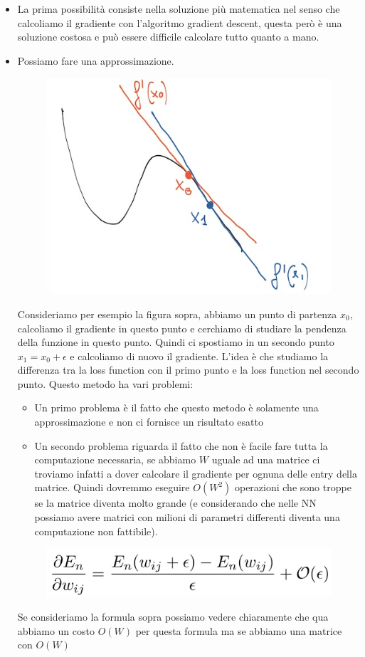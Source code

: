 \documentclass[14pt]{extreport}
\begin{document}
\begin{itemize}
\item La prima possibilità consiste nella soluzione più matematica nel senso che calcoliamo il gradiente con l'algoritmo gradient descent, questa però
è una soluzione costosa e può essere difficile calcolare tutto quanto a mano.
\item Possiamo fare una approssimazione. 

\begin{figure}[H]
\centering
\includegraphics[width=0.4\linewidth]{378.jpeg}
\end{figure} 
Consideriamo per esempio la figura sopra, abbiamo un punto di partenza $x_0$, calcoliamo il gradiente in questo punto e cerchiamo di studiare la
	pendenza della funzione in questo punto. Quindi ci spostiamo in un secondo punto $x_1 = x_0 + \epsilon$ e calcoliamo di nuovo il gradiente. L'idea è
	che studiamo la differenza tra la loss function con il primo punto e la loss function nel secondo punto. Questo metodo ha vari problemi:
	\begin{itemize}
	\item Un primo problema è il fatto che questo metodo è solamente una approssimazione e non ci fornisce un risultato esatto
	\item Un secondo problema riguarda il fatto che non è facile fare tutta la computazione necessaria, se abbiamo $W$ uguale ad una matrice ci troviamo
	infatti a dover calcolare il gradiente per ognuna delle entry della matrice. Quindi dovremmo eseguire $O(W^2)$ operazioni che sono troppe se la
	matrice diventa molto grande (e considerando che nelle NN possiamo avere matrici con milioni di parametri differenti diventa una computazione non
	fattibile).
	\end{itemize} 
\begin{figure}[H]
\centering
\includegraphics[width=0.5\linewidth]{379.jpeg}
\end{figure}
Se consideriamo la formula sopra possiamo vedere chiaramente che qua abbiamo un costo $O(W)$ per questa formula ma se abbiamo una matrice con $O(W)$

\end{itemize}
\end{document}
